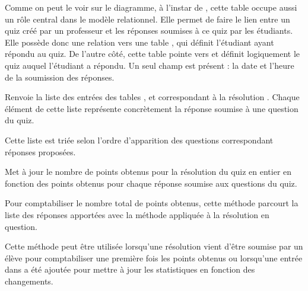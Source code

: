 \documentclass[a4,10pt,french]{sphinxmanual}
\begin{document}

\begin{fulllineitems}
\label{database:quiz.models.CompletedQuiz}
Comme on peut le voir sur le diagramme, à l'instar de , cette table
occupe aussi un rôle central dans le modèle relationnel. Elle permet de faire
le lien entre un quiz créé par un professeur et les réponses soumises à ce quiz
par les étudiants. Elle possède donc une relation vers une table ,
qui définit l'étudiant ayant répondu au quiz. De l'autre côté, cette table pointe
vers  et définit logiquement le quiz auquel l'étudiant a répondu. Un seul
champ est présent : la date et l'heure de la soumission des réponses.

\begin{fulllineitems}
\label{database:quiz.models.CompletedQuiz.get_questions_submits}
Renvoie la liste des entrées des tables ,  et
 correspondant à la résolution .
Chaque élément de cette liste représente concrètement la réponse soumise à
une question du quiz.

Cette liste est triée selon l'ordre d'apparition des questions correspondant
réponses proposées.

\end{fulllineitems}


\begin{fulllineitems}
\label{database:quiz.models.CompletedQuiz.update_total_result}
Met à jour le nombre de points obtenus pour la résolution du quiz en entier
en fonction des points obtenus pour chaque réponse soumise aux questions
du quiz.

Pour comptabiliser le nombre total de points obtenus, cette méthode parcourt
la liste des réponses apportées avec la méthode 
appliquée à la résolution en question.

Cette méthode peut être utilisée lorsqu'une résolution vient d'être soumise
par un élève pour comptabiliser une première fois les points obtenus ou 
lorsqu'une entrée dans  a été ajoutée pour mettre à jour les
statistiques en fonction des changements.

\end{fulllineitems}


\end{fulllineitems}
\end{document}
